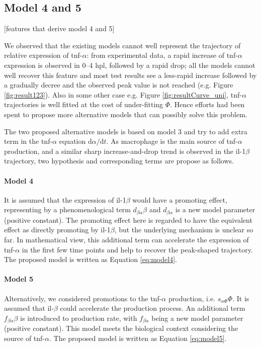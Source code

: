 \documentclass[12pt,a4paper]{report}
\begin{document}
\subsection{Model 4 and 5}

[features that derive model 4 and 5]

We observed that the existing models cannot well represent the trajectory of relative expression of tnf-$\alpha$: from experimental data, a rapid increase of tnf-$\alpha$ expression is observed in 0--4 hpl, followed by a rapid drop; all the models cannot well recover this feature and most test results see a less-rapid increase followed by a gradually decree and the observed peak value is not reached (e.g. Figure \ref{fig:result123}). Also in some other case e.g. Figure \ref{fig:resultCurve_uni}, tnf-$\alpha$ trajectories is well fitted at the cost of under-fitting $\Phi$. Hence efforts had been spent to propose more alternative models that can possibly solve this problem.

The two proposed alternative models is based on model 3 and try to add extra term in the tnf-$\alpha$ equation $\mathrm{d} \alpha/\mathrm{d} t$. As macrophage is the main source of tnf-$\alpha$ production, and a similar sharp increase-and-drop trend is observed in the il-1$\beta$ trajectory, two hypothesis and corresponding terms are propose as follows.

\paragraph{Model 4} It is assumed that the expression of il-1$\beta$ would have a promoting effect, representing by a phenomenological term $d_{\beta\alpha}\beta$ and $d_{\beta\alpha}$ is a new model parameter (positive constant). The promoting effect here is regarded to have the equivalent effect as directly promoting by il-1$\beta$, but the underlying mechanism is unclear so far. In mathematical view, this additional term can accelerate the expression of tnf-$\alpha$ in the first few time points and help to recover the peak-shaped trajectory. The proposed model is written as Equation \ref{eq:model4}.

\paragraph{Model 5} Alternatively, we considered promotions to the tnf-$\alpha$ production, i.e. $s_{\alpha\Phi}\Phi$. It is assumed that il-$\beta$ could accelerate the production process. An additional term $f_{\beta\alpha}\beta$ is introduced to production rate, with $f_{\beta\alpha}$ being a new model parameter (positive constant). This model meets the biological context considering the source of tnf-$\alpha$. The proposed model is written as Equation \ref{eq:model5}.
\end{document}
